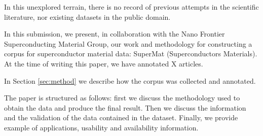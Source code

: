 \documentclass[a4paper,10pt]{article}
\begin{document}
In this unexplored terrain, there is no record of previous attempts in the scientific literature, nor existing datasets in the public domain. 

In this submission, we present, in collaboration with the Nano Frontier Superconducting Material Group, our work and methodology for constructing a corpus for superconductor material data: SuperMat (Superconductors Materials). At the time of writing this paper, we have annotated X articles. 

In Section \ref{sec:method} we describe how the corpus was collected and annotated.

The paper is structured as follows: first we discuss the methodology used to obtain the data and produce the final result. Then we discuss the information and the validation of the data contained in the dataset. Finally, we provide example of applications, usability and availability information. 








\end{document}
